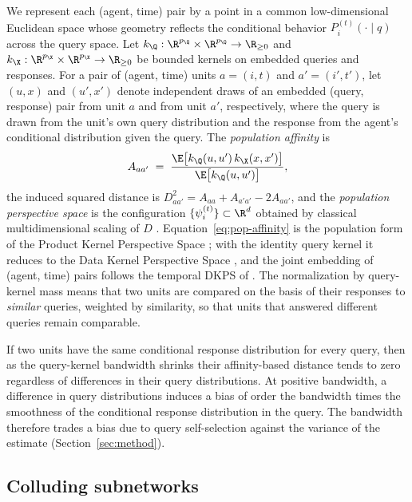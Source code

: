 We represent each (agent, time) pair by a point in a common low-dimensional Euclidean space whose geometry reflects the conditional behavior $P_i^{(t)}(\cdot\mid q)$ across the query space. Let $k_\Q:\R^{p_\Q}\times\R^{p_\Q}\to\R_{\ge 0}$ and $k_\X:\R^{p_\X}\times\R^{p_\X}\to\R_{\ge 0}$ be bounded kernels on embedded queries and responses. For a pair of (agent, time) units $a=(i,t)$ and $a'=(i',t')$, let $(u,x)$ and $(u',x')$ denote independent draws of an embedded (query, response) pair from unit $a$ and from unit $a'$, respectively, where the query is drawn from the unit's own query distribution and the response from the agent's conditional distribution given the query. The \emph{population affinity} is
\begin{equation}
\label{eq:pop-affinity}
A_{aa'} \;=\; \frac{\E\big[k_\Q(u,u')\,k_\X(x,x')\big]}{\E\big[k_\Q(u,u')\big]},
\end{equation}
the induced squared distance is $D^2_{aa'} = A_{aa} + A_{a'a'} - 2A_{aa'}$, and the \emph{population perspective space} is the configuration $\{\psi_i^{(t)}\}\subset\R^d$ obtained by classical multidimensional scaling of $D$ \citep{torgerson1952multidimensional,trosset2024continuous}. Equation~\eqref{eq:pop-affinity} is the population form of the Product Kernel Perspective Space \citep{pkps2026}; with the identity query kernel it reduces to the Data Kernel Perspective Space \citep{helm2024tracking,helm2025statistical}, and the joint embedding of (agent, time) pairs follows the temporal DKPS of \citet{bridgeford2025detecting}. The normalization by query-kernel mass means that two units are compared on the basis of their responses to \emph{similar} queries, weighted by similarity, so that units that answered different queries remain comparable.

\begin{remark}
If two units have the same conditional response distribution for every query, then as the query-kernel bandwidth shrinks their affinity-based distance tends to zero regardless of differences in their query distributions. At positive bandwidth, a difference in query distributions induces a bias of order the bandwidth times the smoothness of the conditional response distribution in the query. The bandwidth therefore trades a bias due to query self-selection against the variance of the estimate (Section~\ref{sec:method}).
\end{remark}

\subsection{Colluding subnetworks}
\label{sec:collusion}

